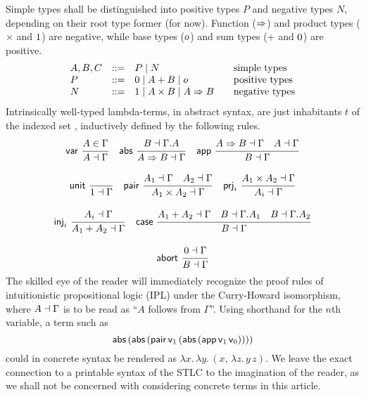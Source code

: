 \documentclass[sigplan,screen,fleqn,review]{acmart} %
\begin{document}
Simple types shall be distinguished into positive types $P$ and
negative types $N$, depending on their root type former (for now).  Function
($\Rightarrow$) and product types ($\times$ and $1$) are negative,
while base types ($o$) and sum types ($+$ and $0$) are positive.
\[
\begin{array}{lrl@{\qquad}l}
  A,B,C & ::= & P \mid N & \mbox{simple types} \\
  P     & ::= & \tyzero \mid A + B \mid \tybase & \mbox{positive types} \\
  N     & ::= & \tyone \mid A \times B \mid A \To B
    & \mbox{negative types} \\
\end{array}
\]
Intrinsically well-typed lambda-terms, in abstract syntax,
are just inhabitants $t$ of the indexed set ,
inductively defined by the following rules.
\begin{gather*}
  \nru{\tvar}{A \in \Gamma}{A \from \Gamma}
\quad
  \nru{\tabs}{B \from \cext \Gamma A}{A \To B \from \Gamma}
\quad
  \nru{\tapp}
    {A \To B \from \Gamma \quad A \from \Gamma}
    {B \from \Gamma}
\\[2ex]
  \nru{\tunit}{}{\tyone \from \Gamma}
\quad
  \nru{\tpair}
    {A_1 \from \Gamma \quad A_2 \from \Gamma}
    {A_1 \times A_2 \from \Gamma}
\quad
  \nru{\tprj_i}
    {A_1 \times A_2 \from \Gamma}
    {A_i \from \Gamma}
\\[2ex]
  \nru{\tinj_i}
    {A_i \from \Gamma}
    {A_1 + A_2 \from \Gamma}
\quad
  \nru{\tcase}
    {A_1 + A_2 \from \Gamma
      \quad B \from \cext \Gamma A_1
      \quad B \from \cext \Gamma A_2
    }{B \from \Gamma}
\\[2ex]
  \nru{\tabort}
    {\tyzero \from \Gamma}
    {B \from \Gamma}
\end{gather*}
The skilled eye of the reader will immediately recognize the proof
rules of intuitionistic propositional logic (IPL) under the
Curry-Howard isomorphism, where $A \dashv \Gamma$ is to be read as
``$A$ follows from $\Gamma$''.  Using shorthand
 for the $n$th variable,
a term such as
\[
  \mathsf{abs}\,(\mathsf{abs}\,(\mathsf{pair}\,
    \mathsf{v}_{1}\,
    (\mathsf{abs}\,(\mathsf{app}\,\mathsf{v}_{1}\,\mathsf{v}_{0}))))
\]
could in concrete syntax be rendered as
\(
  \lambda x.\,\lambda y.\,(x,\,\lambda z.\,y\,z)
  .
\)
We leave the exact connection to a printable
syntax of the STLC to the imagination of the reader,
as we shall not be concerned with considering
concrete terms in this article.
\end{document}
